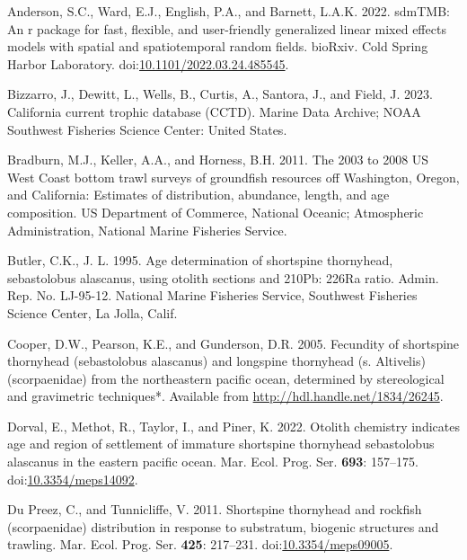 \documentclass[11pt,
  letterpaper,
]{article}
\newlength{\cslhangindent}
\newenvironment{CSLReferences}[2] %
 {%
  \setlength{\parindent}{0pt}
  \ifodd #1 \everypar{\setlength{\hangindent}{\cslhangindent}}\ignorespaces\fi
  \ifnum #2 > 0
  \setlength{\parskip}{#2\baselineskip}
  \fi
 }%
 {}
\begin{document}
\hypertarget{refs}{}
\begin{CSLReferences}{1}{0}
\leavevmode{}%
Anderson, S.C., Ward, E.J., English, P.A., and Barnett, L.A.K. 2022. sdmTMB: An r package for fast, flexible, and user-friendly generalized linear mixed effects models with spatial and spatiotemporal random fields. bioRxiv. Cold Spring Harbor Laboratory. doi:\href{https://doi.org/10.1101/2022.03.24.485545}{10.1101/2022.03.24.485545}.

\leavevmode{}%
Bizzarro, J., Dewitt, L., Wells, B., Curtis, A., Santora, J., and Field, J. 2023. California current trophic database (CCTD). Marine Data Archive; NOAA Southwest Fisheries Science Center: United States.

\leavevmode{}%
Bradburn, M.J., Keller, A.A., and Horness, B.H. 2011. The 2003 to 2008 {US} {West} {Coast} bottom trawl surveys of groundfish resources off {Washington}, {Oregon}, and {California}: Estimates of distribution, abundance, length, and age composition. US Department of Commerce, National Oceanic; Atmospheric Administration, National Marine Fisheries Service.

\leavevmode{}%
Butler, C.K., J. L. 1995. Age determination of shortspine thornyhead, sebastolobus alascanus, using otolith sections and 210Pb: 226Ra ratio. Admin. Rep. No. LJ-95-12. National Marine Fisheries Service, Southwest Fisheries Science Center, La Jolla, Calif.

\leavevmode{}%
Cooper, D.W., Pearson, K.E., and Gunderson, D.R. 2005. Fecundity of shortspine thornyhead (sebastolobus alascanus) and longspine thornyhead (s. Altivelis) (scorpaenidae) from the northeastern pacific ocean, determined by stereological and gravimetric techniques*. Available from \url{http://hdl.handle.net/1834/26245}.

\leavevmode{}%
Dorval, E., Methot, R., Taylor, I., and Piner, K. 2022. Otolith chemistry indicates age and region of settlement of immature shortspine thornyhead sebastolobus alascanus in the eastern pacific ocean. Mar. Ecol. Prog. Ser. \textbf{693}: 157--175. doi:\href{https://doi.org/10.3354/meps14092}{10.3354/meps14092}.

\leavevmode{}%
Du Preez, C., and Tunnicliffe, V. 2011. Shortspine thornyhead and rockfish (scorpaenidae) distribution in response to substratum, biogenic structures and trawling. Mar. Ecol. Prog. Ser. \textbf{425}: 217--231. doi:\href{https://doi.org/10.3354/meps09005}{10.3354/meps09005}.


\end{CSLReferences}
\end{document}
